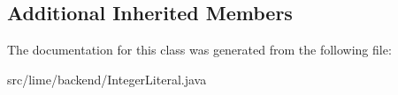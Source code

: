 \subsection*{Additional Inherited Members}


The documentation for this class was generated from the following file\+:\begin{DoxyCompactItemize}
\item 
src/lime/backend/Integer\+Literal.\+java\end{DoxyCompactItemize}
